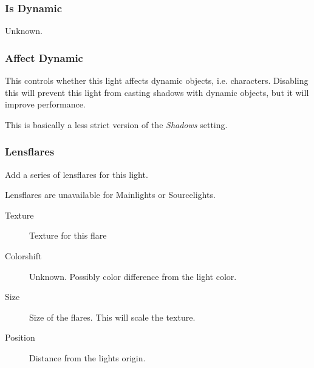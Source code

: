 \subsubsection*{Is Dynamic}
Unknown.

\subsubsection*{Affect Dynamic}
This controls whether this light affects dynamic objects, i.e. characters.
Disabling this will prevent this light from casting shadows with dynamic
objects, but it will improve performance.

This is basically a less strict version of the \textit{Shadows} setting.

\subsubsection*{Lensflares}
Add a series of lensflares for this light.

Lensflares are unavailable for Mainlights or Sourcelights.
\begin{description}
    \item[Texture] Texture for this flare
    \item[Colorshift] Unknown. Possibly color difference from the light color.
    \item[Size] Size of the flares. This will scale the texture.
    \item[Position] Distance from the lights origin.
\end{description}
